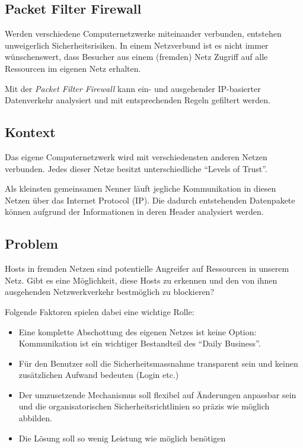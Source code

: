 \subsection{Packet Filter Firewall}
\label{sec:packet-filter-firewall}

Werden verschiedene Computernetzwerke miteinander verbunden, entstehen unweigerlich Sicherheitsrisiken. In einem Netzverbund ist es nicht immer wünschenswert, dass Besucher aus einem (fremden) Netz Zugriff auf alle Ressourcen im eigenen Netz erhalten.

Mit der \emph{Packet Filter Firewall} kann ein- und ausgehender IP-basierter Datenverkehr analysiert und mit entsprechenden Regeln gefiltert werden.


\subsection*{Kontext}
Das eigene Computernetzwerk wird mit verschiedensten anderen Netzen verbunden. Jedes dieser Netze besitzt unterschiedliche ``Levels of Trust''.

Als kleinsten gemeinsamen Nenner läuft jegliche Kommunikation in diesen Netzen über das Internet Protocol (IP). Die dadurch entstehenden Datenpakete können aufgrund der Informationen in deren Header analysiert werden.

\subsection*{Problem}
Hosts in fremden Netzen sind potentielle Angreifer auf Ressourcen in unserem Netz. Gibt es eine Möglichkeit, diese Hosts zu erkennen und den von ihnen ausgehenden Netzwerkverkehr bestmöglich zu blockieren?

Folgende Faktoren spielen dabei eine wichtige Rolle:

\begin{itemize}
	\item Eine komplette Abschottung des eigenen Netzes ist keine Option: Kommunikation ist ein wichtiger Bestandteil des ``Daily Business''.
	\item Für den Benutzer soll die Sicherheitsmassnahme transparent sein und keinen zusätzlichen Aufwand bedeuten (Login etc.)
	\item Der umzusetzende Mechanismus soll flexibel auf Änderungen anpassbar sein und die organisatorischen Sicherheitsrichtlinien so präzis wie möglich abbilden.
	\item Die Lösung soll so wenig Leistung wie möglich benötigen
\end{itemize}


